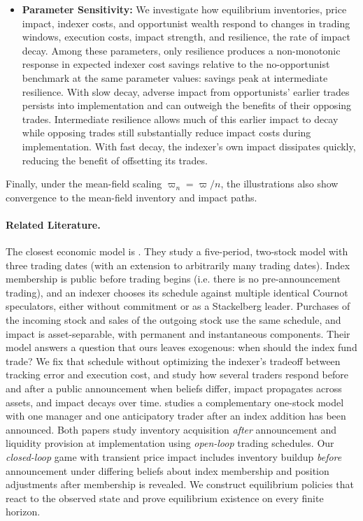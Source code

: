 \documentclass[12pt]{article}
\numberwithin{equation}{section}
\theoremstyle{definition}
\begin{document}
\begin{enumerate}
\begin{itemize}
\item \textbf{Parameter Sensitivity:}
We investigate how equilibrium inventories, price impact, indexer costs,
and opportunist wealth respond to changes in trading windows, execution
costs, impact strength, and resilience, the rate of impact decay.
Among these parameters,
only resilience produces a non-monotonic response in expected indexer cost
savings relative to the no-opportunist benchmark at the same parameter
values: savings peak at intermediate resilience.
With slow decay, adverse impact from opportunists' earlier
trades persists into implementation and can outweigh the benefits of their
opposing trades. Intermediate resilience allows much of this earlier impact
to decay while opposing trades still substantially reduce impact costs
during implementation. With fast decay, the indexer's own impact dissipates
quickly, reducing the benefit of offsetting its trades.
\end{itemize}
Finally, under the mean-field scaling \(\varpi_n=\varpi/n\),
the illustrations also show convergence to the mean-field inventory and
impact paths.
\end{enumerate}

\paragraph{Related Literature.}
The closest economic model is
\citet{PegoraroSammonShim2026}.  They study a five-period, two-stock model with
three trading dates (with an extension to arbitrarily many trading
dates). Index membership is public before trading begins (i.e. there is no pre-announcement trading), and an
indexer chooses its schedule against multiple identical Cournot
speculators, either without commitment or as a Stackelberg leader.  Purchases
of the incoming stock and sales of the outgoing stock use the same schedule,
and impact is asset-separable, with permanent and instantaneous components.
Their model answers a question that ours leaves exogenous: when should the
index fund trade? We fix that schedule without optimizing the indexer's tradeoff
between tracking error and execution cost, and study how several traders respond
before and after a public announcement when beliefs differ, impact propagates
across assets, and impact decays over time.  \citet{Tasitsiomi2025} studies a
complementary one-stock model with one manager and one anticipatory trader
after an index addition has been announced. Both papers study inventory
acquisition \emph{after} announcement and liquidity provision at implementation
using \emph{open-loop} trading schedules. Our \emph{closed-loop} game
with transient price impact includes inventory buildup \emph{before} announcement
under differing beliefs about index membership and position adjustments
after membership is revealed. We construct equilibrium policies that react
to the observed state and prove equilibrium existence on every finite
horizon.
\end{document}
